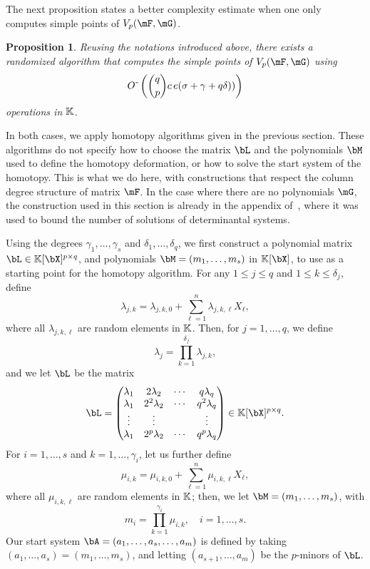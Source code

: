 \documentclass[12pt]{article}
\newtheorem{proposition}[definition]{Proposition}
\begin{document}
The next proposition states a better complexity estimate when one only
computes simple points of $\VpFG{p}{\mF}{\mG}$.
\begin{proposition}\label{prop:coldeg_simple}
  Reusing the notations introduced above, 
  there exists a randomized algorithm that computes the simple points of $\VpFG{p}{\mF}{\mG}$ using
  $$ 
  {O}{\,\tilde{ }\,}\left (   {q \choose p}c \,e (\sigma+\gamma+q\delta)) \right )
  $$ 
  operations in $\mathbb{K}$.
\end{proposition}
In both cases, we apply homotopy algorithms given in the previous
section.  These algorithms do not specify how to choose the matrix
$\bL$ and the polynomials $\bM$ used to define the homotopy
deformation, or how to solve the start system of the homotopy. This is
what we do here, with constructions that respect the column degree
structure of matrix $\mF$. In the case where there are no polynomials
$\mG$, the construction used in this section is already in the
appendix of~\cite{NieRan09}, where it was used to bound the number of
solutions of determinantal systems.

Using the degrees $\gamma_1,\dots,\gamma_s$ and
$\delta_1,\dots,\delta_q$, we first construct a polynomial matrix $\bL
\in \KK[\bX]^{p \times q}$, and polynomials $\bM=(m_1,\dots,m_s)$ in
$\KK[\bX]$, to use as a starting point for the homotopy algorithm. For
any $1 \leq j \leq q$ and $1 \leq k \leq \delta_j$, define
$$\lambda_{j,k} = \lambda_{j,k,0} + \sum_{\ell =
  1}^{n}\lambda_{j,k,\ell}X_\ell,$$ where all $\lambda_{j,k,\ell}$ are
random elements in $\mathbb{K}$. Then, for $j=1,\dots,q$, we define
$$\lambda_j = \prod_{k=1}^{\delta_j}\lambda_{j,k},$$
and we let  $\bL$ be the matrix
\begin{align}\label{eqdef:col}
\bL = 
\left( \begin{matrix}
\lambda_1 & 2\lambda_2 & \cdots & q\lambda_{q}\\
\lambda_1 & 2^2\lambda_2 & \cdots & q^2\lambda_q\\
\vdots & \vdots &  & \vdots \\
\lambda_1 & 2^p\lambda_2 & \cdots & q^p\lambda_q
\end{matrix} \right) \in \KK[\bX]^{p\times q}.
\end{align}
For $i=1,\dots,s$ and $k=1,\dots,\gamma_i$, let us further define
$$\mu_{i,k} =  \mu_{i,k,0} + \sum_{\ell = 1}^{n}\mu_{i,k,\ell}X_\ell,$$ where
all $\mu_{i,k,\ell}$ are random elements in $\mathbb{K}$; then, we let
$\bM=(m_1,\dots,m_s)$, with
$$m_i=\prod_{k=1}^{\gamma_i} \mu_{i,k}, \quad i=1,\dots,s.$$ Our start
system $\bA=(a_1,\dots,a_s,\dots,a_m)$ is defined by taking
$(a_1,\dots,a_s) = (m_1,\dots,m_s)$, and letting $(a_{s+1},\dots,a_m)$
be the $p$-minors of $\bL$.
\end{document}
